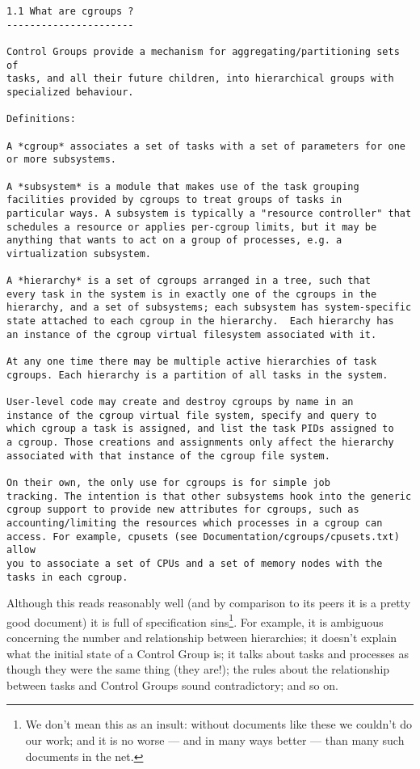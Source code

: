 \documentclass[a4paper,twoside,12pt]{article}
\begin{document}
\begin{verbatim}
1.1 What are cgroups ?
----------------------

Control Groups provide a mechanism for aggregating/partitioning sets of
tasks, and all their future children, into hierarchical groups with
specialized behaviour.

Definitions:

A *cgroup* associates a set of tasks with a set of parameters for one
or more subsystems.

A *subsystem* is a module that makes use of the task grouping
facilities provided by cgroups to treat groups of tasks in
particular ways. A subsystem is typically a "resource controller" that
schedules a resource or applies per-cgroup limits, but it may be
anything that wants to act on a group of processes, e.g. a
virtualization subsystem.

A *hierarchy* is a set of cgroups arranged in a tree, such that
every task in the system is in exactly one of the cgroups in the
hierarchy, and a set of subsystems; each subsystem has system-specific
state attached to each cgroup in the hierarchy.  Each hierarchy has
an instance of the cgroup virtual filesystem associated with it.

At any one time there may be multiple active hierarchies of task
cgroups. Each hierarchy is a partition of all tasks in the system.

User-level code may create and destroy cgroups by name in an
instance of the cgroup virtual file system, specify and query to
which cgroup a task is assigned, and list the task PIDs assigned to
a cgroup. Those creations and assignments only affect the hierarchy
associated with that instance of the cgroup file system.

On their own, the only use for cgroups is for simple job
tracking. The intention is that other subsystems hook into the generic
cgroup support to provide new attributes for cgroups, such as
accounting/limiting the resources which processes in a cgroup can
access. For example, cpusets (see Documentation/cgroups/cpusets.txt) allow
you to associate a set of CPUs and a set of memory nodes with the
tasks in each cgroup.
\end{verbatim}
Although this reads reasonably well (and by comparison to its peers it is a pretty good document) it is
full of specification sins\footnote{We don't mean this as an insult: without documents like these we couldn't do our work; and it is no worse --- and in many ways better --- than many such documents in the net.}. For example, it is ambiguous concerning the number and relationship between hierarchies; it
doesn't explain what the initial state of a Control Group is; it talks about tasks and processes as though they were the same thing (they are!); the rules about the relationship between tasks and Control Groups sound contradictory; and so on.
\end{document}
